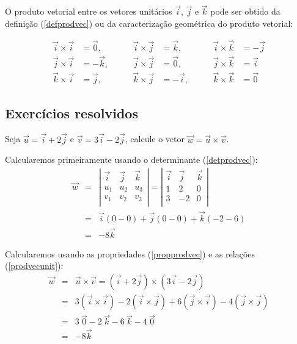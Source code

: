 O produto vetorial entre os vetores unitários $\vec{i}$, $\vec{j}$ e $\vec{k}$ pode ser obtido da definição (\ref{defprodvec}) ou da caracterização geométrica do produto vetorial:

\begin{align}\label{prodvecunit}
\vec{i}\times \vec{i}&=\vec{0},\qquad & \vec{i}\times \vec{j}&=\vec{k},\qquad &\vec{i}\times \vec{k}&=-\vec{j}\nonumber\\
\vec{j}\times \vec{i}&=-\vec{k},\qquad & \vec{j}\times \vec{j}&=\vec{0},\qquad& \vec{j}\times \vec{k}&=\vec{i}\nonumber\\
\vec{k}\times \vec{i}&=\vec{j},\qquad &\vec{k}\times \vec{j}&=-\vec{i},\qquad &\vec{k}\times \vec{k}&=\vec{0}
\end{align}

\subsection*{Exercícios resolvidos}

\begin{exer} Seja $\vec{u}=\vec{i}+2\vec{j}$ e $\vec{v}=3\vec{i}-2\vec{j}$, calcule o vetor $\vec{w}=\vec{u}\times\vec{v}$.
\end{exer}
\begin{resol}
 Calcularemos primeiramente usando o determinante (\ref{detprodvec}):
\begin{eqnarray*}\vec{w}&=&\left|\begin{array}{ccc}
\vec{i}&\vec{j}&\vec{k}\\
u_1 & u_2 & u_3\\
v_1 & v_2 & v_3\\
\end{array}
\right|=\left|\begin{array}{ccc}
\vec{i}&\vec{j}&\vec{k}\\
1 & 2 & 0\\
3 & -2& 0\\
\end{array} \right|\\
&=&\vec{i}(0-0)+\vec{j}(0-0)+\vec{k}(-2-6)\\
&=&-8\vec{k}
\end{eqnarray*}

 Calcularemos usando as propriedades (\ref{propprodvec}) e as relações (\ref{prodvecunit}):
\begin{eqnarray*}\vec{w}&=&\vec{u}\times\vec{v}= \left(\vec{i}+2\vec{j}\right)\times\left(3\vec{i}-2\vec{j}\right)\\
&=&3(\vec{i}\times\vec{i})-2(\vec{i}\times\vec{j})+6(\vec{j}\times\vec{i})-4(\vec{j}\times\vec{j})\\
&=&3~\!\vec{0}-2~\!\vec{k}-6~\!\vec{k}-4~\!\vec{0}\\
&=&-8\vec{k}
\end{eqnarray*}
\end{resol}

